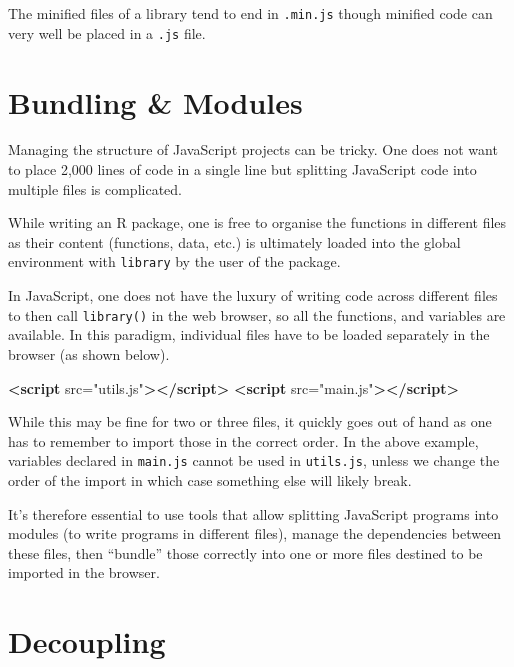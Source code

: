 \documentclass[
]{krantz}
\makeatletter
\newenvironment{Shaded}{\begin{snugshade}}{\end{snugshade}}
\newcommand{\KeywordTok}[1]{\textcolor[rgb]{0.27,0.27,0.27}{\textbf{#1}}}
\newcommand{\OtherTok}[1]{\textcolor[rgb]{0.37,0.37,0.37}{#1}}
\newcommand{\StringTok}[1]{\textcolor[rgb]{0.5,0.5,0.5}{#1}}
\newenvironment{kframe}{%
\medskip{}
\setlength{\fboxsep}{.8em}
 \def\at@end@of@kframe{}%
 \ifinner\ifhmode%
  \def\at@end@of@kframe{\end{minipage}}%
  \begin{minipage}{\columnwidth}%
 \fi\fi%
 \def\FrameCommand##1{\hskip\@totalleftmargin \hskip-\fboxsep
 \colorbox{shadecolor}{##1}\hskip-\fboxsep
     \hskip-\linewidth \hskip-\@totalleftmargin \hskip\columnwidth}%
 \MakeFramed {\advance\hsize-\width
   \@totalleftmargin\z@ \linewidth\hsize
   \@setminipage}}%
 {\par\unskip\endMakeFramed%
 \at@end@of@kframe}
\renewenvironment{Shaded}{\begin{kframe}}{\end{kframe}}
\makeatother
\begin{document}
The minified files of a library tend to end in \texttt{.min.js} though minified code can very well be placed in a \texttt{.js} file.

\hypertarget{webpack-structure}{%
\section{Bundling \& Modules}\label{webpack-structure}}

Managing the structure of JavaScript projects can be tricky. One does not want to place 2,000 lines of code in a single line but splitting JavaScript code into multiple files is complicated.

While writing an R package, one is free to organise the functions in different files as their content (functions, data, etc.) is ultimately loaded into the global environment with \texttt{library} by the user of the package.

In JavaScript, one does not have the luxury of writing code across different files to then call \texttt{library()} in the web browser, so all the functions, and variables are available. In this paradigm, individual files have to be loaded separately in the browser (as shown below).

\begin{Shaded}
\begin{Highlighting}[]
\KeywordTok{<script}\OtherTok{ src=}\StringTok{"utils.js"}\KeywordTok{></script>}
\KeywordTok{<script}\OtherTok{ src=}\StringTok{"main.js"}\KeywordTok{></script>}
\end{Highlighting}
\end{Shaded}

While this may be fine for two or three files, it quickly goes out of hand as one has to remember to import those in the correct order. In the above example, variables declared in \texttt{main.js} cannot be used in \texttt{utils.js}, unless we change the order of the import in which case something else will likely break.

It's therefore essential to use tools that allow splitting JavaScript programs into modules (to write programs in different files), manage the dependencies between these files, then ``bundle'' those correctly into one or more files destined to be imported in the browser.

\hypertarget{webpack-decouple}{%
\section{Decoupling}\label{webpack-decouple}}
\end{document}
